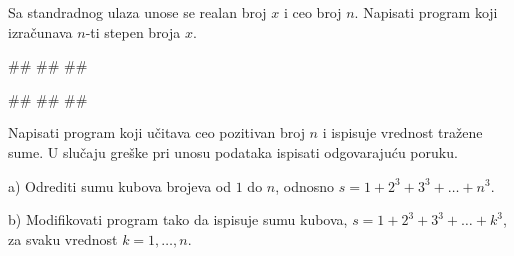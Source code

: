 \begin{Exercise}[label=p1.3_09]
 Sa standradnog ulaza unose se realan broj $x$ i ceo broj
 $n$. Napisati program koji izračunava $n$-ti stepen broja $x$. 
 
\begin{miditest}
\begin{upotreba}{1}
#\naslovInt#
##
##
\end{upotreba}
\end{miditest}
\begin{miditest}
\begin{upotreba}{2}
#\naslovInt#
##
##
\end{upotreba}
\end{miditest}
\end{Exercise}
\begin{Answer}[ref=p1.3_09]
\end{Answer}


\begin{Exercise}[label=v1.3_13] 
Napisati program koji učitava ceo pozitivan broj $n$ i ispisuje
vrednost tražene sume. U slučaju greške pri unosu podataka ispisati
odgovarajuću poruku.
\begin{description}
\item{a)} Odrediti sumu kubova brojeva od $1$ do $n$, odnosno $s =
  1+2^3+3^3+ \ldots +n^3$.
\item{b)} Modifikovati program tako da ispisuje sumu kubova, $s =
  1+2^3+3^3+ \ldots +k^3$, za svaku vrednost $k = 1, \ldots, n$.
\end{description}
\end{Exercise}
\begin{Answer}[ref=v1.3_13]
\end{Answer}


